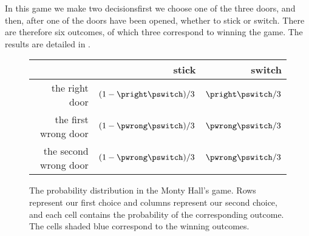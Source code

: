 In this game we make two decisions\dash first we choose one of the three doors, and then, after one of the doors have been opened, whether to stick or switch.
There are therefore six outcomes, of which three correspond to winning the game.
The results are detailed in .
\begin{figure}[htb]
    \renewcommand{\arraystretch}{1.2}
    \begin{tabular}{r|r|r|}
        & stick & switch \\
        \hline
        the right door & \cellcolor{cyan!25}$(1-\pright\pswitch)/3$ & $\pright\pswitch/3$ \\
        \hline
        the first wrong door & $(1-\pwrong\pswitch)/3$ & \cellcolor{cyan!25}$\pwrong\pswitch/3$ \\
        \hline
        the second wrong door & $(1-\pwrong\pswitch)/3$ & \cellcolor{cyan!25}$\pwrong\pswitch/3$ \\
        \hline
    \end{tabular}
    \caption{The probability distribution in the Monty Hall's game.
    Rows represent our first choice and columns represent our second choice, and each cell contains the probability of the corresponding outcome.
    The cells shaded blue correspond to the winning outcomes.} \label{fig:C-1b}
\end{figure}
